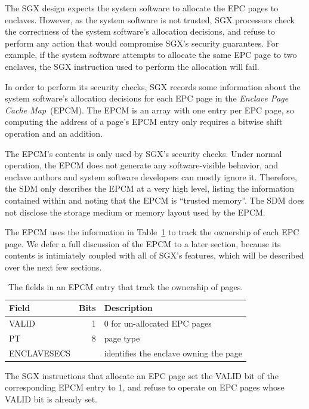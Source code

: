 The SGX design expects the system software to allocate the EPC pages to
enclaves. However, as the system software is not trusted, SGX processors check
the correctness of the system software's allocation decisions, and refuse to
perform any action that would compromise SGX's security guarantees. For
example, if the system software attempts to allocate the same EPC page to two
enclaves, the SGX instruction used to perform the allocation will fail.

In order to perform its security checks, SGX records some information about the
system software's allocation decisions for each EPC page in the
\textit{Enclave Page Cache Map}~(EPCM). The EPCM is an array with one entry
per EPC page, so computing the address of a page's EPCM entry only requires a
bitwise shift operation and an addition.

The EPCM's contents is only used by SGX's security checks. Under normal
operation, the EPCM does not generate any software-visible behavior, and
enclave authors and system software developers can mostly ignore it.
Therefore, the SDM only describes the EPCM at a very high level, listing the
information contained within and noting that the EPCM is ``trusted memory''.
The SDM does not disclose the storage medium or memory layout used by the EPCM.

The EPCM uses the information in Table~\ref{fig:sgx_epcm_ownership_fields} to
track the ownership of each EPC page. We defer a full discussion of the EPCM to
a later section, because its contents is intimiately coupled with all of SGX's
features, which will be described over the next few sections.

\begin{table}[hbt]
  \centering
  \begin{tabularx}{\columnwidth}{| l | r | X |}
  \hline
  \textbf{Field} & \textbf{Bits} & \textbf{Description}\\
  \hline
  VALID & 1 & 0 for un-allocated EPC pages \\
  \hline
  PT & 8 & page type \\
  \hline
  ENCLAVESECS &  & identifies the enclave owning the page \\
  \hline
  \end{tabularx}
  \caption{
    The fields in an EPCM entry that track the ownership of pages.
  }
  \label{fig:sgx_epcm_ownership_fields}
\end{table}

The SGX instructions that allocate an EPC page set the VALID bit of the
corresponding EPCM entry to 1, and refuse to operate on EPC pages whose VALID
bit is already set.

